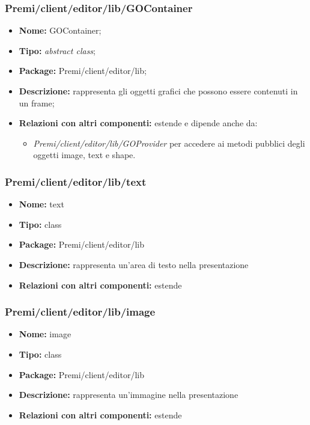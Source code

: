 \subsubsection{Premi/client/editor/lib/GOContainer}
\begin{itemize}
  \item[] \textbf{Nome:} GOContainer;
  \item[] \textbf{Tipo:} \textit{abstract class};
  \item[] \textbf{Package:} Premi/client/editor/lib;
  \item[] \textbf{Descrizione:} rappresenta gli oggetti grafici che possono essere contenuti in un frame; 
  \item[] \textbf{Relazioni con altri componenti:} estende  e dipende anche da:
  \begin{itemize} 
	\item \textit{Premi/client/editor/lib/GOProvider} per accedere ai metodi pubblici degli oggetti image, text e shape.
\end{itemize}  
\end{itemize}
\subsubsection{Premi/client/editor/lib/text}
\begin{itemize}
  \item[] \textbf{Nome:} text
  \item[] \textbf{Tipo:} class
  \item[] \textbf{Package:} Premi/client/editor/lib
  \item[] \textbf{Descrizione:} rappresenta un'area di testo nella presentazione
  \item[] \textbf{Relazioni con altri componenti:} estende 
\end{itemize}
\subsubsection{Premi/client/editor/lib/image}
\begin{itemize}
  \item[] \textbf{Nome:} image
  \item[] \textbf{Tipo:} class
  \item[] \textbf{Package:} Premi/client/editor/lib
  \item[] \textbf{Descrizione:} rappresenta un'immagine nella presentazione
  \item[] \textbf{Relazioni con altri componenti:} estende 
\end{itemize}
